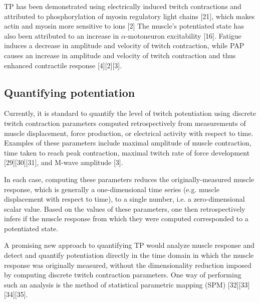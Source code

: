\documentclass[utf8]{style/FrontiersinHarvard}
\begin{document}
TP has been demonstrated using electrically induced twitch contractions and attributed to phosphorylation of myosin regulatory light chains [21], which makes actin and myosin more sensitive to  ions [2]
The muscle's potentiated state has also been attributed to an increase in $ \alpha $-motoneuron excitability [16].
Fatigue induces a decrease in amplitude and velocity of twitch contraction, while PAP causes an increase in amplitude and velocity of twitch contraction and thus enhanced contractile response [4][2][3].

\subsection{Quantifying potentiation}
Currently, it is standard to quantify the level of twitch potentiation using discrete twitch contraction parameters computed retrospectively from measurements of muscle displacement, force production, or electrical activity with respect to time.
Examples of these parameters include maximal amplitude of muscle contraction, time taken to reach peak contraction, maximal twitch rate of force development [29][30][31], and M-wave amplitude [3].

In each case, computing these parameters reduces the originally-measured muscle response, which is generally a one-dimensional time series (e.g. muscle displacement with respect to time), to a single number, i.e. a zero-dimensional scalar value.
Based on the values of these parameters, one then retrospectively infers if the muscle response from which they were computed corresponded to a potentiated state.

A promising new approach to quantifying TP would analyze 
muscle response and detect and quantify potentiation directly in the time domain in which the muscle response was originally measured, without the dimensionality reduction imposed by computing discrete twitch contraction parameters.
One way of performing such an analysis is the method of statistical parametric mapping (SPM) [32][33][34][35].
\end{document}

